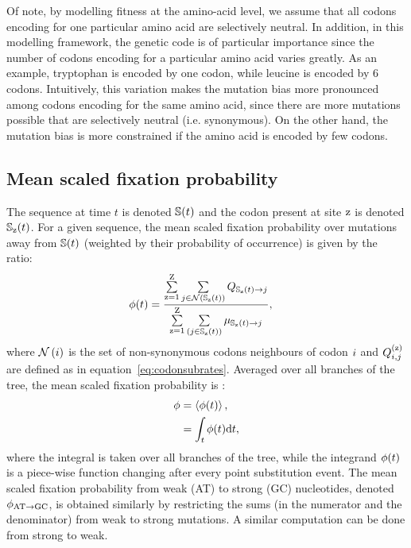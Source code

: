 \documentclass{article}
\begin{document}
Of note, by modelling fitness at the amino-acid level, we assume that all codons encoding for one particular amino acid are selectively {neutral}.
In addition, in this modelling framework, the genetic code is of particular importance since the number of codons encoding for a particular amino acid varies greatly.
As an example, tryptophan is encoded by one codon, while leucine is encoded by 6 codons.
Intuitively, this variation makes the mutation bias more pronounced among codons encoding for the same amino acid, since there are more mutations possible that are selectively {neutral} (i.e. synonymous).
On the other hand, the mutation bias is more constrained if the amino acid is encoded by few codons.

\subsection{Mean scaled fixation probability}
\label{subsec:fixation-bias}
The sequence at time $t$ is denoted $\mathbb{S}(t)$ and the codon present at site $\text{z}$ is denoted $\mathbb{S}_{\text{z}}(t)$.
For a given sequence, the mean scaled fixation probability over mutations away from $\mathbb{S}(t)$ (weighted by their probability of occurrence) is given by the ratio:
\begin{align}
 \phi (t) & = \dfrac{ \sum\limits_{\text{z}=1}^{\text{Z}} \sum\limits_{{j} \in \mathcal{N} \left ( \mathbb{S}_{\text{z}}(t) \right)} Q_{\mathbb{S}_{\text{z}}(t) \to {j}}}{ \sum\limits_{\text{z}=1}^{\text{Z}} \sum\limits_{\left ( {j} \in \mathbb{S}_{\text{z}}(t) \right)} \mu_{\mathbb{S}_{\text{z}}(t) \to {j}}},
\end{align}
where $\mathcal{N}\left({i}\right)$ is the set of {non-synonymous} codons neighbours of codon ${i}$ and $Q_{{i}, {j}}^{(\text{z})}$ are defined as in equation~\ref{eq:codonsubrates}.
Averaged over all branches of the tree, the mean scaled fixation probability is :
\begin{align}
 \phi & = \left\langle \phi (t) \right\rangle, \\
 & = \int_{t} \phi (t) \mathrm{d} t,
\end{align}
where the integral is taken over all branches of the tree, while the integrand $\phi (t)$ is a piece-wise function changing after every point {substitution} event.
The mean scaled fixation probability from weak (AT) to strong (GC) nucleotides, denoted $\phi_{\text{AT} \rightarrow \text{GC}}$, is obtained similarly by restricting the sums (in the numerator and the denominator) from weak to strong mutations.
A similar computation can be done from strong to weak.
\end{document}
